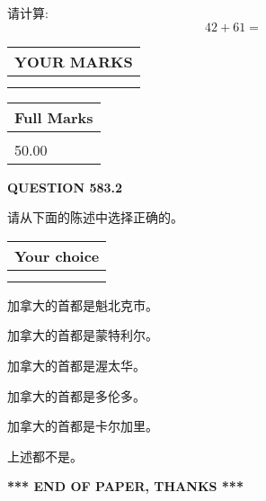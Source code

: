 \documentclass{ctexart}
\begin{document}
  
 
请计算:
\begin{equation}
42 +  %
61 = \nonumber
\end{equation}
 

 

 
  
\vspace{0.2in}
  
\noindent\begin{tabular}{|l|}
\hline
 YOUR MARKS  \\
\hline
 \\ 
 \\ 
\hline
\end{tabular}
\hspace{0.05in} \begin{tabular}{|l|}
\hline
 Full Marks  \\
\hline
 \\ 
50.00 \\
\hline
\end{tabular}
{\textbf{\Large{QUESTION
583.2 
}}}
  
  
请从下面的陈述中选择正确的。
  
  
\noindent\hspace{3.0in} \begin{tabular}{|l|}
\hline
Your choice \\
\hline
 \\ 
 \\ 
\hline
\end{tabular}
  
  
 
 
加拿大的首都是魁北克市。
 
 
加拿大的首都是蒙特利尔。
 
 
加拿大的首都是渥太华。
 
 
加拿大的首都是多伦多。
 
 
加拿大的首都是卡尔加里。
 
 
 上述都不是。
 
 
   
   
 \vspace{0.2in}
 
   
   
   
   
\vspace{1.0in} 
{\textbf{\large{ *** END OF PAPER, THANKS *** }}} 
   
\end{document}
